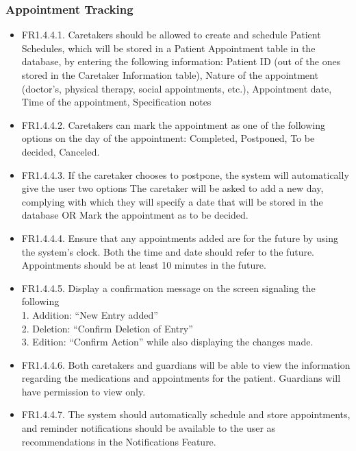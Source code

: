 \documentclass[12pt,a4paper]{article}
\begin{document}
\subsubsection{Appointment Tracking}
\begin{itemize}
    \item FR1.4.4.1. Caretakers should be allowed to create and schedule Patient Schedules, which will be 
stored in a Patient Appointment table in the database, by entering the following 
information: Patient ID (out of the ones stored in the Caretaker Information table), Nature of the appointment (doctor’s, physical therapy, social appointments, etc.), Appointment date, Time of the appointment, Specification notes 
    \item FR1.4.4.2. Caretakers can mark the appointment as one of the following options on the day of the 
appointment: Completed, Postponed, To be decided, Canceled. 
    \item FR1.4.4.3. If the caretaker chooses to postpone, the system will automatically give the user two 
options The caretaker will be asked to add a new day, complying with which they will 
specify a date that will be stored in the database OR Mark the appointment as to be 
decided.
    \item FR1.4.4.4. Ensure that any appointments added are for the future by using the system’s clock. 
Both the time and date should refer to the future. Appointments should be at least 10 
minutes in the future. 
    \item FR1.4.4.5. Display a confirmation message on the screen signaling the following\\ 
1. Addition: “New Entry added” \\
2. Deletion: “Confirm Deletion of Entry” \\
3. Edition: “Confirm Action” while also displaying the changes made. 
    \item FR1.4.4.6. Both caretakers and guardians will be able to view the information regarding the 
medications and appointments for the patient. Guardians will have permission to 
view only. 
    \item FR1.4.4.7. The system should automatically schedule and store appointments, and reminder 
notifications should be available to the user as recommendations in the Notifications Feature. 
\end{itemize}
\end{document}
